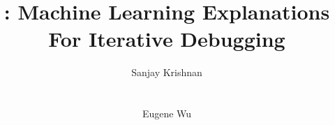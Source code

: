\documentclass{sig-alternate}
\begin{document}
\newcommand{\gray}[1]{{{\textcolor{lightgray}{\{#1\}}}\xspace}}
\newcommand{\ewu}[1]{{{\textcolor{red}{\{ewu: #1\}}}\xspace}}
\newcommand{\reminder}[1]{{{\textcolor{magenta}{\{\{\bf #1\}\}}}\xspace}}
\newcommand{\specialcell}[2][c]{%
  \begin{tabular}[#1]{@{}c@{}}#2\end{tabular}}

\def\ojoin{\setbox0=\hbox{$\bowtie$}%
  \rule[-.02ex]{.25em}{.4pt}\llap{\rule[\ht0]{.25em}{.4pt}}}
\def\leftouterjoin{\mathbin{\ojoin\mkern-5.8mu\bowtie}}
\def\rightouterjoin{\mathbin{\bowtie\mkern-5.8mu\ojoin}}
\def\fullouterjoin{\mathbin{\ojoin\mkern-5.8mu\bowtie\mkern-5.8mu\ojoin}}


\newcommand{\stitle}[1]{\vspace{0.5em}\noindent\textbf{#1}}



\pagestyle{plain}

%

\title{\sys: Machine Learning Explanations For Iterative Debugging}


\author{ 
\alignauthor
Sanjay Krishnan \\
 \\
\\
\alignauthor
Eugene Wu \\
 \\
\\
}




\maketitle
\end{document}
